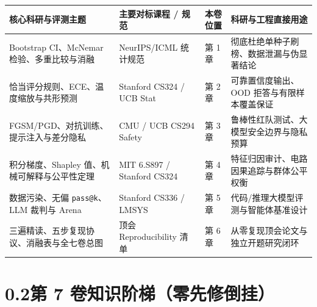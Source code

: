 \begin{center}
\footnotesize
\begin{tabularx}{\linewidth}{@{}p{35mm}p{35mm}p{15mm}X@{}}
\toprule
\textbf{核心科研与评测主题} & \textbf{主要对标课程 / 规范} & \textbf{本卷位置} & \textbf{科研与工程直接用途} \\
\midrule
Bootstrap CI、McNemar 检验、多重比较与消融 & NeurIPS/ICML 统计规范 & 第 1 章 & 彻底杜绝单种子刷榜、数据泄漏与伪显著结论 \\
恰当评分规则、ECE、温度缩放与共形预测 & Stanford CS324 / UCB Stat & 第 2 章 & 可靠置信度输出、OOD 拒答与有限样本覆盖保证 \\
FGSM/PGD、对抗训练、提示注入与差分隐私 & CMU / UCB CS294 Safety & 第 3 章 & 鲁棒性红队测试、大模型安全边界与隐私预算 \\
积分梯度、Shapley 值、机械可解释与公平性定理 & MIT 6.S897 / Stanford CS324 & 第 4 章 & 特征归因审计、电路因果追踪与群体公平权衡 \\
数据污染、无偏 \texttt{pass@k}、LLM 裁判与 Arena & Stanford CS336 / LMSYS & 第 5 章 & 代码/推理大模型评测与智能体基准设计 \\
三遍精读、五步复现协议、消融表与全七卷总图 & 顶会 Reproducibility 清单 & 第 6 章 & 从零复现顶会论文与独立开题研究闭环 \\
\bottomrule
\end{tabularx}
\end{center}

\section*{0.2\quad 第 7 卷知识阶梯（零先修倒挂）}

